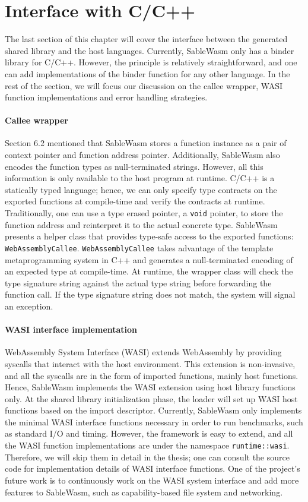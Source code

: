 \section{Interface with C/C++}
The last section of this chapter will cover the interface between the generated
shared library and the host languages. Currently, SableWasm only has a binder
library for C/C++. However, the principle is relatively straightforward, and
one can add implementations of the binder function for any other language. In
the rest of the section, we will focus our discussion on the callee wrapper,
WASI function implementations and error handling strategies.

\paragraph{Callee wrapper}
Section 6.2 mentioned that SableWasm stores a function instance as a pair of
context pointer and function address pointer. Additionally, SableWasm also
encodes the function types as null-terminated strings. However, all this
information is only available to the host program at runtime. C/C++ is a
statically typed language; hence, we can only specify type contracts on the
exported functions at compile-time and verify the contracts at runtime.
Traditionally, one can use a type erased pointer, a \texttt{void} pointer,
to store the function address and reinterpret it to the actual concrete type.
SableWasm presents a helper class that provides type-safe access to the
exported functions: \texttt{WebAssemblyCallee}. \texttt{WebAssemblyCallee} takes
advantage of the template metaprogramming system in C++ and generates
a null-terminated encoding of an expected type at compile-time. At runtime,
the wrapper class will check the type signature string against the actual type
string before forwarding the function call. If the type signature string does
not match, the system will signal an exception.

\paragraph{WASI interface implementation}
WebAssembly System Interface (WASI) extends WebAssembly by providing syscalls
that interact with the host environment. This extension is non-invasive, and
all the syscalls are in the form of imported functions, mainly host
functions. Hence, SableWasm implements the WASI extension using host library
functions only. At the shared library initialization phase, the loader will set
up WASI host functions based on the import descriptor. Currently, SableWasm only
implements the minimal WASI interface functions necessary in order to run
benchmarks, such as standard I/O and timing. However, the framework is easy to
extend, and all the WASI function implementations are under the namespace
\texttt{runtime::wasi}. Therefore, we will skip them in detail in the thesis;
one can consult the source code for implementation details of WASI interface
functions. One of the project's future work is to continuously work on the
WASI system interface and add more features to SableWasm, such as
capability-based file system and networking.

